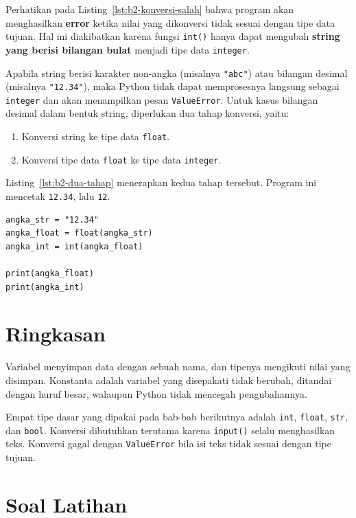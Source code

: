 Perhatikan pada Listing~\ref{lst:b2-konversi-salah} bahwa program akan menghasilkan \textbf{error} ketika nilai yang dikonversi tidak sesuai dengan tipe data tujuan. Hal ini diakibatkan karena fungsi \texttt{int()} hanya dapat mengubah \textbf{string yang berisi bilangan bulat} menjadi tipe data \texttt{integer}.
\par
Apabila string berisi karakter non-angka (misalnya \texttt{"abc"}) atau bilangan desimal (misalnya \texttt{"12.34"}), maka Python tidak dapat memprosesnya langsung sebagai \texttt{integer} dan akan menampilkan pesan \texttt{ValueError}. Untuk kasus bilangan desimal dalam bentuk string, diperlukan dua tahap konversi, yaitu:
\begin{enumerate}
	\item Konversi string ke tipe data \texttt{float}.
	\item Konversi tipe data \texttt{float} ke tipe data \texttt{integer}.
\end{enumerate}

Listing~\ref{lst:b2-dua-tahap} menerapkan kedua tahap tersebut. Program ini mencetak \texttt{12.34}, lalu \texttt{12}.

\begin{lstlisting}[style=PythonStyle, caption={Kode Python: konversi_dua_tahap.py}, label={lst:b2-dua-tahap}]
angka_str = "12.34"
angka_float = float(angka_str)
angka_int = int(angka_float)

print(angka_float)
print(angka_int)
\end{lstlisting}

\section{Ringkasan}
Variabel menyimpan data dengan sebuah nama, dan tipenya mengikuti nilai yang disimpan. Konstanta adalah variabel yang disepakati tidak berubah, ditandai dengan huruf besar, walaupun Python tidak mencegah pengubahannya.

Empat tipe dasar yang dipakai pada bab-bab berikutnya adalah \texttt{int}, \texttt{float}, \texttt{str}, dan \texttt{bool}. Konversi dibutuhkan terutama karena \texttt{input()} selalu menghasilkan teks. Konversi gagal dengan \texttt{ValueError} bila isi teks tidak sesuai dengan tipe tujuan.

\section{Soal Latihan}

